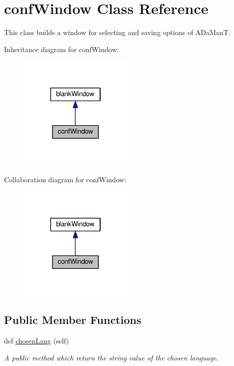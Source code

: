 \hypertarget{classcalc__ep_1_1confWindow}{}\section{conf\+Window Class Reference}
\label{classcalc__ep_1_1confWindow}


This class builds a window for selecting and saving options of A\+Da\+ManT.  




Inheritance diagram for conf\+Window\+:
\nopagebreak
\begin{figure}[H]
\begin{center}
\leavevmode
\includegraphics[width=154pt]{classcalc__ep_1_1confWindow__inherit__graph}
\end{center}
\end{figure}


Collaboration diagram for conf\+Window\+:
\nopagebreak
\begin{figure}[H]
\begin{center}
\leavevmode
\includegraphics[width=154pt]{classcalc__ep_1_1confWindow__coll__graph}
\end{center}
\end{figure}
\subsection*{Public Member Functions}
\begin{DoxyCompactItemize}
\item 
def \hyperlink{classcalc__ep_1_1confWindow_a355ed316a41bdc8259ac11af5a2556f3}{chosen\+Lang} (self)\hypertarget{classcalc__ep_1_1confWindow_a355ed316a41bdc8259ac11af5a2556f3}{}\label{classcalc__ep_1_1confWindow_a355ed316a41bdc8259ac11af5a2556f3}

\begin{DoxyCompactList}\small\item\em A public method which return the string value of the chosen language. \end{DoxyCompactList}\end{DoxyCompactItemize}



